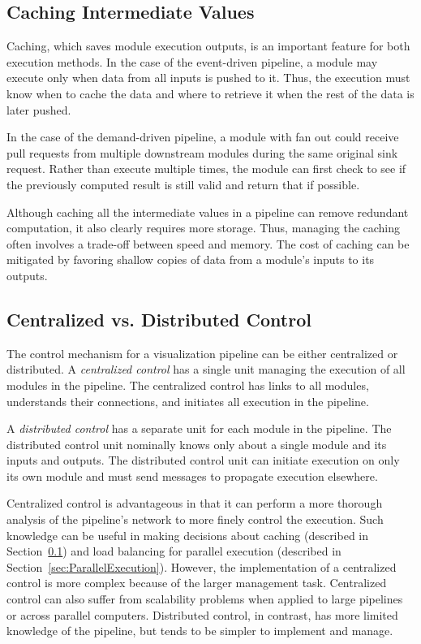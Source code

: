 \documentclass[journal,onecolumn,12pt,letterpaper,twoside]{IEEEtran}
\newcommand*{\keyterm}[1]{\emph{#1}}
\begin{document}
\subsection{Caching Intermediate Values}
\label{sec:Caching}

Caching, which saves module execution outputs, is an important feature
for both execution methods.  In the case of the event-driven pipeline, a
module may execute only when data from all inputs is pushed to it.
Thus, the execution must know when to cache the data and where to retrieve
it when the rest of the data is later pushed.

In the case of the demand-driven pipeline, a module with fan out could
receive pull requests from multiple downstream modules during the same
original sink request.  Rather than execute multiple times, the module
can first check to see if the previously computed result is still valid and
return that if possible.

Although caching all the intermediate values in a pipeline can remove
redundant computation, it also clearly requires more storage.  Thus,
managing the caching often involves a trade-off between speed and memory.
The cost of caching can be mitigated by favoring shallow copies of data
from a module's inputs to its outputs.

\subsection{Centralized vs. Distributed Control}
\label{sec:CentralizedDistributed}

The control mechanism for a visualization pipeline can be either
centralized or distributed.  A \keyterm{centralized control} has a single
unit managing the execution of all modules in the pipeline.  The
centralized control has links to all modules, understands their
connections, and initiates all execution in the pipeline.

A \keyterm{distributed control} has a separate unit for each module in
the pipeline.  The distributed control unit nominally knows only about a
single module and its inputs and outputs.  The distributed control unit
can initiate execution on only its own module and must send messages to
propagate execution elsewhere.

Centralized control is advantageous in that it can perform a more thorough
analysis of the pipeline's network to more finely control the execution.
Such knowledge can be useful in making decisions about caching (described
in Section~\ref{sec:Caching}) and load balancing for parallel execution
(described in Section~\ref{sec:ParallelExecution}).  However, the
implementation of a centralized control is more complex because of the
larger management task.  Centralized control can also suffer from
scalability problems when applied to large pipelines or across parallel
computers.  Distributed control, in contrast, has more limited knowledge of
the pipeline, but tends to be simpler to implement and manage.
\end{document}
